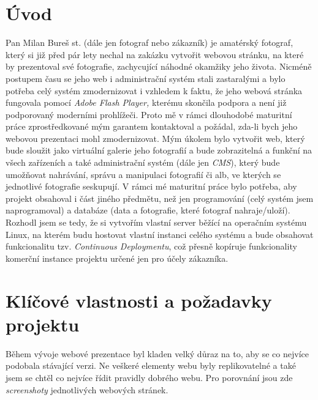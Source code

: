 \documentclass[12pt,a4paper]{report}
\begin{document}
  \chapter{Úvod}
  Pan Milan Bureš st. (dále jen fotograf nebo zákazník) je amatérský fotograf, který si již před pár lety
  nechal na zakázku vytvořit webovou stránku, na které by prezentoval své fotografie, zachycující
  náhodné okamžiky jeho života. Nicméně postupem času se jeho web i administrační systém stali
  zastaralými a bylo potřeba celý systém zmodernizovat i vzhledem k faktu, že jeho webová stránka
  fungovala pomocí \emph{Adobe Flash Player,} kterému skončila podpora a není již podporovaný
  moderními prohlížeči.
  Proto mě v rámci dlouhodobé maturitní práce zprostředkované mým garantem kontaktoval a
  požádal, zda-li bych jeho webovou prezentaci mohl zmodernizovat. Mým úkolem bylo vytvořit
  web, který bude sloužit jako virtuální galerie jeho fotografií a bude zobrazitelná a funkční na všech
  zařízeních a také administrační systém (dále jen \emph{CMS}), který bude umožňovat nahrávání, správu a
  manipulaci fotografií či alb, ve kterých se jednotlivé fotografie seskupují.
  V rámci mé maturitní práce bylo potřeba, aby projekt obsahoval i část jiného předmětu, než
  jen programování (celý systém jsem naprogramoval) a databáze (data a fotografie, které fotograf
  nahraje/uloží). Rozhodl jsem se tedy, že si vytvořím vlastní server běžící na operačním systému
  Linux, na kterém budu hostovat vlastní instanci celého systému a bude obsahovat funkcionalitu
  tzv. \emph{Continuous Deploymentu}, což přesně kopíruje funkcionality komerční instance projektu určené
  jen pro účely zákazníka.

  \chapter{Klíčové vlastnosti a požadavky projektu}
  Během vývoje webové prezentace byl kladen velký důraz na to, aby se co nejvíce podobala
  stávající verzi. Ne veškeré elementy webu byly replikovatelné a také jsem se chtěl co nejvíce řídit
  pravidly dobrého webu. Pro porovnání jsou zde \emph{screenshoty} jednotlivých webových stránek.
\end{document}
